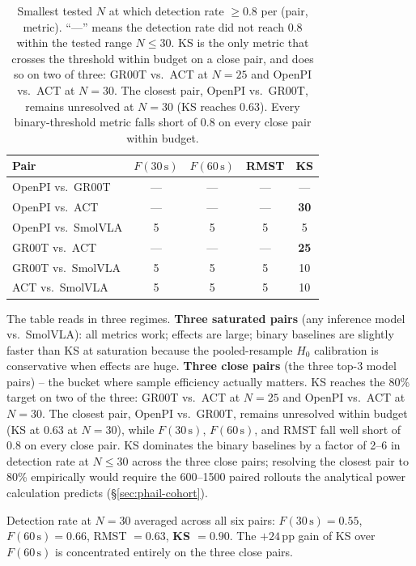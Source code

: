 \documentclass{article}
\begin{document}
\begin{table}[h]
\centering
\begin{tabular}{lcccc}
\toprule
Pair & $F(30\,\text{s})$ & $F(60\,\text{s})$ & RMST & KS \\
\midrule
OpenPI vs.\ GR00T & --- & --- & --- & --- \\
OpenPI vs.\ ACT & --- & --- & --- & \textbf{30} \\
OpenPI vs.\ SmolVLA & 5 & 5 & 5 & 5 \\
GR00T vs.\ ACT & --- & --- & --- & \textbf{25} \\
GR00T vs.\ SmolVLA & 5 & 5 & 5 & 10 \\
ACT vs.\ SmolVLA & 5 & 5 & 5 & 10 \\
\bottomrule
\end{tabular}
\caption{Smallest tested $N$ at which detection rate $\ge 0.8$ per (pair, metric). ``---'' means the detection rate did not reach $0.8$ within the tested range $N \le 30$. KS is the only metric that crosses the threshold within budget on a close pair, and does so on two of three: GR00T vs.\ ACT at $N{=}25$ and OpenPI vs.\ ACT at $N{=}30$. The closest pair, OpenPI vs.\ GR00T, remains unresolved at $N{=}30$ (KS reaches 0.63). Every binary-threshold metric falls short of 0.8 on every close pair within budget.}
\label{tab:efficiency}
\end{table}

The table reads in three regimes. \textbf{Three saturated pairs} (any inference model vs.\ SmolVLA): all metrics work; effects are large; binary baselines are slightly faster than KS at saturation because the pooled-resample $H_0$ calibration is conservative when effects are huge. \textbf{Three close pairs} (the three top-3 model pairs) -- the bucket where sample efficiency actually matters. KS reaches the 80\% target on two of the three: GR00T vs.\ ACT at $N{=}25$ and OpenPI vs.\ ACT at $N{=}30$. The closest pair, OpenPI vs.\ GR00T, remains unresolved within budget (KS at 0.63 at $N=30$), while $F(30\,\text{s})$, $F(60\,\text{s})$, and RMST fall well short of 0.8 on every close pair. KS dominates the binary baselines by a factor of 2--6 in detection rate at $N \le 30$ across the three close pairs; resolving the closest pair to 80\% empirically would require the 600--1500 paired rollouts the analytical power calculation predicts (\S\ref{sec:phail-cohort}).

Detection rate at $N = 30$ averaged across all six pairs: $F(30\,\text{s}) = 0.55$, $F(60\,\text{s}) = 0.66$, RMST $= 0.63$, \textbf{KS $= 0.90$}. The $+24$\,pp gain of KS over $F(60\,\text{s})$ is concentrated entirely on the three close pairs.
\end{document}
